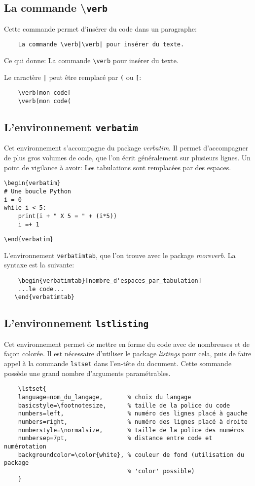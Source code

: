 \subsection*{La commande \textbackslash \texttt{verb}}
Cette commande permet d'insérer du code dans un paragraphe:
\begin{verbatim}
    La commande \verb|\verb| pour insérer du texte.
\end{verbatim}
\medskip

Ce qui donne: La commande \verb|\verb| pour insérer du texte.
\medskip

Le caractère \texttt{|} peut être remplacé par \texttt{(} ou \texttt{[}:
\begin{verbatim} 
    \verb[mon code[
    \verb(mon code(
\end{verbatim}
\medskip

\subsection*{L'environnement \texttt{verbatim}}
Cet environnement s'accompagne du package \textit{verbatim}. Il permet d'accompagner de plus gros volumes de code, que l'on écrit généralement sur plusieurs lignes. Un point de vigilance à avoir: Les tabulations sont remplacées par des espaces.
\begin{verbatim}
\begin{verbatim}
# Une boucle Python
i = 0
while i < 5:
    print(i + " X 5 = " + (i*5))
    i =+ 1 
\end{verbatim}
\verb|\end{verbatim}|
\medskip

L'environnement \texttt{verbatimtab}, que l'on trouve avec le package \textit{moreverb}. La syntaxe est la suivante:
\begin{verbatim}
    \begin{verbatimtab}[nombre_d'espaces_par_tabulation]
    ...le code...
   \end{verbatimtab}
\end{verbatim}
\medskip

\subsection*{L'environnement \texttt{lstlisting}}
Cet environnement permet de mettre en forme du code avec de nombreuses et de façon colorée. Il est nécessaire d'utiliser le package \textit{listings} pour cela, puis de faire appel à la commande \texttt{lstset} dans l'en-tête du document. Cette sommande possède une grand nombre d'arguments paramétrables.
\begin{verbatim}
    \lstset{
    language=nom_du_langage,       % choix du langage
    basicstyle=\footnotesize,      % taille de la police du code
    numbers=left,                  % numéro des lignes placé à gauche
    numbers=right,                 % numéro des lignes placé à droite
    numberstyle=\normalsize,       % taille de la police des numéros
    numbersep=7pt,                 % distance entre code et numérotation
    backgroundcolor=\color{white}, % couleur de fond (utilisation du package 
                                   % 'color' possible)
    }
\end{verbatim}
\medskip

